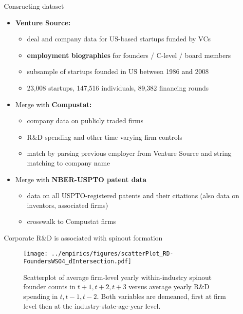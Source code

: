 \documentclass[english,usenames,dvipsnames,handout]{beamer}
\begin{document}
\begin{frame}{Consructing dataset}
\begin{itemize}
	\item<+-> \alert{\textbf{Venture Source:}} 
	\begin{itemize}
		\item deal and company data for US-based startups funded by VCs
		\item \alert{\textbf{employment biographies}} for founders / C-level / board members
		\item subsample of startups founded in US between 1986 and 2008
		\item 23,008 startups, 147,516 individuals, 89,382 financing rounds
	\end{itemize}
	\medskip
	\item<+-> Merge with \alert{\textbf{Compustat:}}
	\begin{itemize}
		\item company data on publicly traded firms 
		\item R\&D spending and other time-varying firm controls
		\item match by parsing previous employer from Venture Source and string matching to company name
	\end{itemize}
	\medskip
	\item<+-> Merge with \alert{\textbf{NBER-USPTO patent data}}
	\begin{itemize}
		\item data on all USPTO-registered patents and their citations (also data on inventors, associated firms)
		\item crosswalk to Compustat firms
	\end{itemize}
\end{itemize}
\end{frame}

\begin{frame}{Corporate R\&D is associated with spinout formation}

\begin{figure}[!htb]
\centering
\texttt{[image: ../empirics/figures/scatterPlot\_RD-FoundersWSO4\_dIntersection.pdf]}
\caption{Scatterplot of average firm-level yearly within-industry spinout founder counts in $t+1,t+2,t+3$ versus average yearly R\&D spending in $t,t-1,t-2$. Both variables are demeaned, first at firm level then at the industry-state-age-year level.}
\end{figure}
\end{frame}
\end{document}
